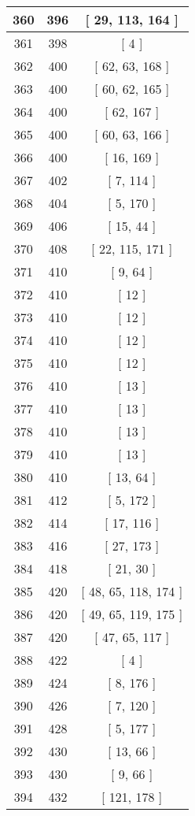 \begin{center}
\begin{longtable}[H]{|| c c c ||}
\hline
360 & 396 & [ 29, 113, 164 ] \\ 
\hline
361 & 398 & [ 4 ] \\ 
\hline
362 & 400 & [ 62, 63, 168 ] \\ 
\hline
363 & 400 & [ 60, 62, 165 ] \\ 
\hline
364 & 400 & [ 62, 167 ] \\ 
\hline
365 & 400 & [ 60, 63, 166 ] \\ 
\hline
366 & 400 & [ 16, 169 ] \\ 
\hline
367 & 402 & [ 7, 114 ] \\ 
\hline
368 & 404 & [ 5, 170 ] \\ 
\hline
369 & 406 & [ 15, 44 ] \\ 
\hline
370 & 408 & [ 22, 115, 171 ] \\ 
\hline
371 & 410 & [ 9, 64 ] \\ 
\hline
372 & 410 & [ 12 ] \\ 
\hline
373 & 410 & [ 12 ] \\ 
\hline
374 & 410 & [ 12 ] \\ 
\hline
375 & 410 & [ 12 ] \\ 
\hline
376 & 410 & [ 13 ] \\ 
\hline
377 & 410 & [ 13 ] \\ 
\hline
378 & 410 & [ 13 ] \\ 
\hline
379 & 410 & [ 13 ] \\ 
\hline
380 & 410 & [ 13, 64 ] \\ 
\hline
381 & 412 & [ 5, 172 ] \\ 
\hline
382 & 414 & [ 17, 116 ] \\ 
\hline
383 & 416 & [ 27, 173 ] \\ 
\hline
384 & 418 & [ 21, 30 ] \\ 
\hline
385 & 420 & [ 48, 65, 118, 174 ] \\ 
\hline
386 & 420 & [ 49, 65, 119, 175 ] \\ 
\hline
387 & 420 & [ 47, 65, 117 ] \\ 
\hline
388 & 422 & [ 4 ] \\ 
\hline
389 & 424 & [ 8, 176 ] \\ 
\hline
390 & 426 & [ 7, 120 ] \\ 
\hline
391 & 428 & [ 5, 177 ] \\ 
\hline
392 & 430 & [ 13, 66 ] \\ 
\hline
393 & 430 & [ 9, 66 ] \\ 
\hline
394 & 432 & [ 121, 178 ] \\ 

\end{longtable}
\end{center}
